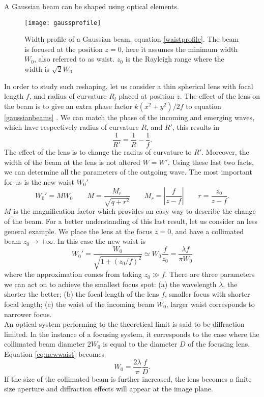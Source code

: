A Gaussian beam can be shaped using optical elements.
\begin{figure}
\centering
\texttt{[image: gaussprofile]}
\caption{Width profile of a Gaussian beam, equation \eqref{waistprofile}. The beam is focused at the position $z = 0$, here it assumes the minimum width $W_0$, also referred to as waist. $z_0$ is the Rayleigh range where the width is $\sqrt{2}W_0$}
\label{gaussprofile}
\end{figure}
In order to study such reshaping, let us consider a thin spherical lens with focal length $f$, and radius of curvature $R_l$ placed at position $z$. The effect of the lens on the beam is to give an extra phase factor $k(x^2 + y^2)/2f$ to equation \eqref{gaussianbeams} \cite{beamparameters}. We can match the phase of the incoming and emerging waves, which have respectively radius of curvature $R$, and $R'$, this results in
\begin{equation}
\frac{1}{R'} = \frac{1}{R} - \frac{1}{f}.
\end{equation}
The effect of the lens is to change the radius of curvature to $R'$. Moreover, the width of the beam at the lens is not altered $W=W'$. Using these last two facts, we can determine all the parameters of the outgoing wave. The most important for us is the new waist $W_0'$
\begin{equation}
W_0' = MW_0 \qquad M = \frac{M_r}{\sqrt{q+r^2}} \qquad M_r = \left|\frac{f}{z-f}\right| \qquad r = \frac{z_0}{z-f}.
\end{equation}
$M$ is the magnification factor which provides an easy way to describe the change of the beam. For a better understanding of this last result, let us consider an less general example. We place the lens at the focus $z=0$, and have a collimated beam $z_0 \to +\infty $. In this case the new waist is
\begin{equation}
\label{eq:newwaist}
W_0' = \frac{W_0}{\sqrt{1 + (z_0/f)^2}} \simeq W_0\frac{f}{z_0} = \frac{\lambda f}{\pi W_0}
\end{equation}
where the approximation comes from taking $z_0\gg f$. There are three parameters we can act on to achieve the smallest focus spot: (a) the wavelength $\lambda$, the shorter the better; (b) the focal length of the lens $f$, smaller focus with shorter focal length; (c) the waist of the incoming beam $W_0$, larger waist corresponds to narrower focus.\\
An optical system performing to the theoretical limit is said to be diffraction limited. In the instance of a focusing system, it corresponds to the case where the collimated beam diameter $2W_0$ is equal to the diameter $D$ of the focusing lens. Equation \ref{eq:newwaist} becomes
\begin{equation}
W_0 = \frac{2\lambda}{\pi} \frac{f}{D}.
\end{equation}
If the size of the collimated beam is further increased, the lens becomes a finite size aperture and diffraction effects will appear at the image plane.

